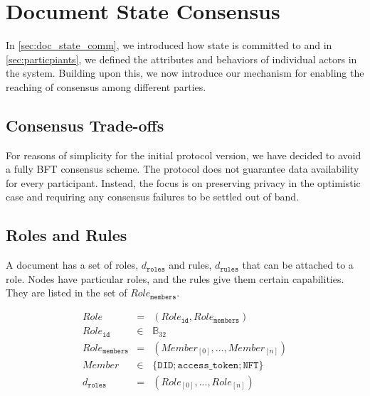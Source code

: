 \section{Document State Consensus}
\label{sec:consensus}
In \ref{sec:doc_state_comm}, we introduced how state is committed to and in \ref{sec:particpiants}, we defined the attributes and behaviors of individual actors in the system. Building upon this, we now introduce our mechanism for enabling the reaching of consensus among different parties.
\subsection{Consensus Trade-offs}
For reasons of simplicity for the initial protocol version, we have decided to avoid a fully BFT consensus scheme. The protocol does not guarantee data availability for every participant. Instead, the focus is on preserving privacy in the optimistic case and requiring any consensus failures to be settled out of band. 

\subsection{Roles and Rules}\label{sec:roles_rules}
A document has a set of roles, $d_{\mathtt{roles}}$ and rules, $d_{\mathtt{rules}}$ that can be attached to a role. Nodes have particular roles, and the rules give them certain capabilities. They are listed in the set of $Role_{\mathtt{members}}$.

\begin{eqnarray}
Role &= &(Role_\mathtt{id},Role_{\mathtt{members}}) \\
Role_{\mathtt{id}} &\in & \mathbb{B}_{32}\\
Role_{\mathtt{members}}  &=& (Member_{[0]},...,Member_{[n]}) \\
Member &\in & \{\mathtt{DID};\mathtt{access\_token};\mathtt{NFT}\} \\
d_{\mathtt{roles}} & = & (Role_{[0]}, ..., Role_{[n]})
\end{eqnarray}


